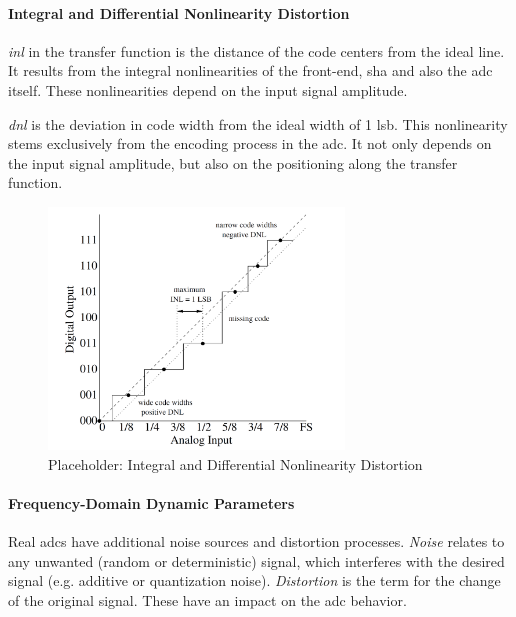 \paragraph{Integral and Differential Nonlinearity Distortion} 
\textit{\gls{inl}} in the transfer function is the distance of the code centers from the ideal line. It results from the integral nonlinearities of the front-end, \gls{sha} and also the \gls{adc} itself. \cite{walt} These nonlinearities depend on the input signal amplitude. \cite{Lundberg}

\textit{\gls{dnl}} is the deviation in code width from the ideal width of 1 \gls{lsb}. This nonlinearity stems exclusively from the encoding process in the \gls{adc}. \cite{walt} It not only depends on the input signal amplitude, but also on the positioning along the transfer function. \cite{Lundberg}

\begin{figure}[tbh]
	\centering
	\includegraphics[width = 0.7\textwidth]{chap/02-theory/img/dnld}
	\caption{Placeholder: Integral and Differential Nonlinearity Distortion \cite{Lundberg}}
	\label{fig:nld}
\end{figure}

\paragraph{Frequency-Domain Dynamic Parameters}
Real \glspl{adc} have additional noise sources and distortion processes. \textit{Noise} relates to any unwanted (random or deterministic) signal, which interferes with the desired signal (e.g. additive or quantization noise). \textit{Distortion} is the term for the change of the original signal. These have an impact on the \gls{adc} behavior. 

